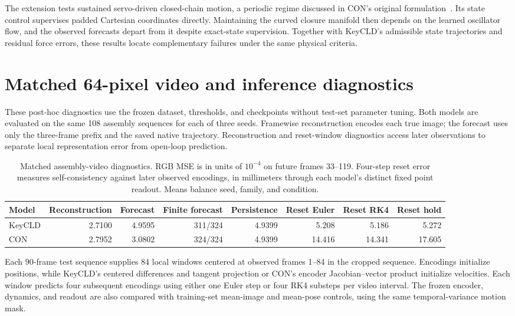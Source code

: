 The extension tests sustained servo-driven closed-chain motion, a periodic regime discussed in CON's original formulation~\cite{stolzle2024con}. Its state control supervises padded Cartesian coordinates directly. Maintaining the curved closure manifold then depends on the learned oscillator flow, and the observed forecasts depart from it despite exact-state supervision. Together with KeyCLD's admissible state trajectories and residual force errors, these results locate complementary failures under the same physical criteria.


\section{Matched 64-pixel video and inference diagnostics}
\label{app:matched-video}
These post-hoc diagnostics use the frozen dataset, thresholds, and checkpoints without test-set parameter tuning. Both models are evaluated on the same 108 assembly sequences for each of three seeds. Framewise reconstruction encodes each true image; the forecast uses only the three-frame prefix and the saved native trajectory. Reconstruction and reset-window diagnostics access later observations to separate local representation error from open-loop prediction.

\begin{table}[t]
\caption{Matched assembly-video diagnostics. RGB MSE is in units of $10^{-4}$ on future frames 33--119. Four-step reset error measures self-consistency against later observed encodings, in millimeters through each model's distinct fixed point readout. Means balance seed, family, and condition.}
\label{app:matched-video-table}
\centering\small
\begin{tabular}{lrrrrrrr}
\toprule
Model & Reconstruction & Forecast & Finite forecast & Persistence & Reset Euler & Reset RK4 & Reset hold\\
\midrule
KeyCLD & 2.7100 & 4.9595 & 311/324 & 4.9399 & 5.208 & 5.186 & 5.272 \\
CON & 2.7952 & 3.0802 & 324/324 & 4.9399 & 14.416 & 14.341 & 17.605 \\
\bottomrule
\end{tabular}
\end{table}

Each 90-frame test sequence supplies 84 local windows centered at observed frames 1--84 in the cropped sequence. Encodings initialize positions, while KeyCLD's centered differences and tangent projection or CON's encoder Jacobian--vector product initialize velocities. Each window predicts four subsequent encodings using either one Euler step or four RK4 substeps per video interval. The frozen encoder, dynamics, and readout are also compared with training-set mean-image and mean-pose controls, using the same temporal-variance motion mask.

